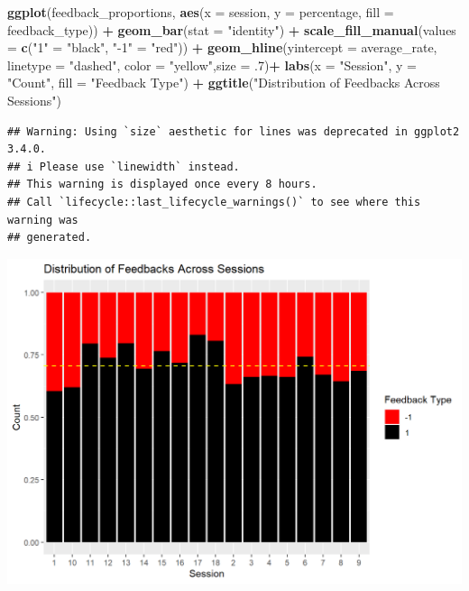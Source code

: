 \documentclass[
]{article}
\newenvironment{Shaded}{\begin{snugshade}}{\end{snugshade}}
\newcommand{\AttributeTok}[1]{\textcolor[rgb]{0.13,0.29,0.53}{#1}}
\newcommand{\DecValTok}[1]{\textcolor[rgb]{0.00,0.00,0.81}{#1}}
\newcommand{\FunctionTok}[1]{\textcolor[rgb]{0.13,0.29,0.53}{\textbf{#1}}}
\newcommand{\NormalTok}[1]{#1}
\newcommand{\OtherTok}[1]{\textcolor[rgb]{0.56,0.35,0.01}{#1}}
\newcommand{\SpecialCharTok}[1]{\textcolor[rgb]{0.81,0.36,0.00}{\textbf{#1}}}
\newcommand{\StringTok}[1]{\textcolor[rgb]{0.31,0.60,0.02}{#1}}
\begin{document}
\begin{Shaded}
\begin{Highlighting}[]
\FunctionTok{ggplot}\NormalTok{(feedback\_proportions, }\FunctionTok{aes}\NormalTok{(}\AttributeTok{x =}\NormalTok{ session, }\AttributeTok{y =}\NormalTok{ percentage, }\AttributeTok{fill =}\NormalTok{ feedback\_type)) }\SpecialCharTok{+}
  \FunctionTok{geom\_bar}\NormalTok{(}\AttributeTok{stat =} \StringTok{"identity"}\NormalTok{) }\SpecialCharTok{+}
  \FunctionTok{scale\_fill\_manual}\NormalTok{(}\AttributeTok{values =} \FunctionTok{c}\NormalTok{(}\StringTok{"1"} \OtherTok{=} \StringTok{"black"}\NormalTok{, }\StringTok{"{-}1"} \OtherTok{=} \StringTok{"red"}\NormalTok{)) }\SpecialCharTok{+} \FunctionTok{geom\_hline}\NormalTok{(}\AttributeTok{yintercept =}\NormalTok{ average\_rate, }\AttributeTok{linetype =} \StringTok{"dashed"}\NormalTok{, }\AttributeTok{color =} \StringTok{"yellow"}\NormalTok{,}\AttributeTok{size =}\NormalTok{ .}\DecValTok{7}\NormalTok{)}\SpecialCharTok{+}
  \FunctionTok{labs}\NormalTok{(}\AttributeTok{x =} \StringTok{"Session"}\NormalTok{, }\AttributeTok{y =} \StringTok{"Count"}\NormalTok{, }\AttributeTok{fill =} \StringTok{"Feedback Type"}\NormalTok{) }\SpecialCharTok{+}
  \FunctionTok{ggtitle}\NormalTok{(}\StringTok{"Distribution of Feedbacks Across Sessions"}\NormalTok{)}
\end{Highlighting}
\end{Shaded}

\begin{verbatim}
## Warning: Using `size` aesthetic for lines was deprecated in ggplot2 3.4.0.
## i Please use `linewidth` instead.
## This warning is displayed once every 8 hours.
## Call `lifecycle::last_lifecycle_warnings()` to see where this warning was
## generated.
\end{verbatim}

\includegraphics{images/unnamed-chunk-9-2.png}
\end{document}

